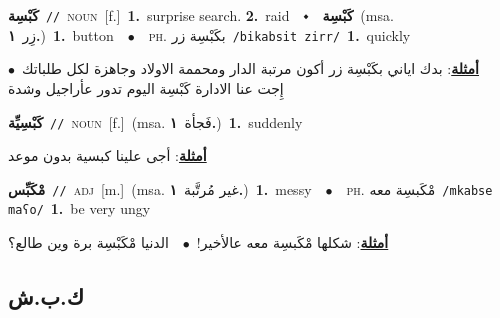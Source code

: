 \documentclass[10pt,a4paper,twoside]{article} %
\begin{document}
\begin{multicols}{2}
{\setlength\topsep{0pt}\textbf{\foreignlanguage{arabic}{كَبْسِة}}\ {\color{gray}\texttt{//}\color{black}}\ \textsc{noun}\ [f.]\ \textbf{1.}~surprise search.  \textbf{2.}~raid\ \ $\smblkdiamond$\ \ \setlength\topsep{0pt}\textbf{\foreignlanguage{arabic}{كَبْسِة}}\ \color{gray}(msa. \foreignlanguage{arabic}{زِر}~\foreignlanguage{arabic}{\textbf{١.}})\color{black}\ \textbf{1.}~button\ \ $\bullet$\ \ \textsc{ph.} \color{gray} \foreignlanguage{arabic}{بكَبْسِة زر}\color{black}\ {\color{gray}\texttt{/{\sffamily bikabsit zirr}/}\color{black}}\ \textbf{1.}~quickly\  \begin{flushright}\color{gray}\foreignlanguage{arabic}{\textbf{\underline{\foreignlanguage{arabic}{أمثلة}}}: بدك اياني بكَبْسِة زر أكون مرتبة الدار ومحممة الاولاد وجاهزة لكل طلباتك\ $\bullet$\ \  إِجت عنا الادارة كَبْسِة اليوم تدور عأراجيل وشدة}\end{flushright}\color{black}} \vspace{2mm}

{\setlength\topsep{0pt}\textbf{\foreignlanguage{arabic}{كَبْسِيِّة}}\ {\color{gray}\texttt{//}\color{black}}\ \textsc{noun}\ [f.]\ \color{gray}(msa. \foreignlanguage{arabic}{فَجأة}~\foreignlanguage{arabic}{\textbf{١.}})\color{black}\ \textbf{1.}~suddenly\  \begin{flushright}\color{gray}\foreignlanguage{arabic}{\textbf{\underline{\foreignlanguage{arabic}{أمثلة}}}: أجى علينا كبسية بدون موعد}\end{flushright}\color{black}} \vspace{2mm}

{\setlength\topsep{0pt}\textbf{\foreignlanguage{arabic}{مْكَبِّس}}\ {\color{gray}\texttt{//}\color{black}}\ \textsc{adj}\ [m.]\ \color{gray}(msa. \foreignlanguage{arabic}{غير مُرتَّبة}~\foreignlanguage{arabic}{\textbf{١.}})\color{black}\ \textbf{1.}~messy\ \ $\bullet$\ \ \textsc{ph.} \color{gray} \foreignlanguage{arabic}{مْكَبسِة معه}\color{black}\ {\color{gray}\texttt{/{\sffamily mkabse maʕo}/}\color{black}}\ \textbf{1.}~be very ungy\  \begin{flushright}\color{gray}\foreignlanguage{arabic}{\textbf{\underline{\foreignlanguage{arabic}{أمثلة}}}: شكلها مْكَبسِة معه عالأخير!\ $\bullet$\ \  الدنيا مْكَبْسِة برة وين طالع؟}\end{flushright}\color{black}} \vspace{2mm}

\vspace{-3mm}
\subsection*{\color{blue}\foreignlanguage{arabic}{ك.ب.ش}\color{blue}{}} 


\end{multicols}
\end{document}
